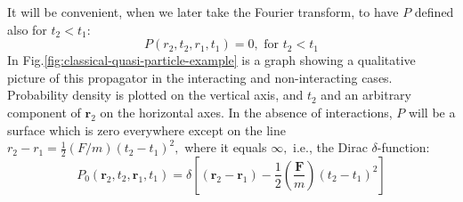 It will be convenient, when we later take the Fourier transform, to have $P$ defined also for $t_2<t_1$:
\begin{equation}P\left(r_{2}, t_{2}, r_{1}, t_{1}\right)=0, \text { for } t_{2}<t_{1}
\label{zero-condition}
\end{equation}
In Fig.\ref{fig:classical-quasi-particle-example} is a graph showing a qualitative picture of this propagator in the interacting and non-interacting cases. Probability density is plotted on the vertical axis, and $t_{2}$ and an arbitrary component of $\mathbf{r}_{2}$ on the horizontal axes. In the absence of interactions, $P$ will be a surface which is zero everywhere except on the line $r_{2}-r_{1}=\frac{1}{2}(F / m)\left(t_{2}-t_{1}\right)^{2},$ where it equals $\infty,$ i.e., the Dirac $\delta$-function:
\begin{equation}P_{0}\left(\mathbf{r}_{2}, t_{2}, \mathbf{r}_{1}, t_{1}\right)=\delta\left[\left(\mathbf{r}_{2}-\mathbf{r}_{1}\right)-\frac{1}{2}\left(\frac{\mathbf{F}}{m}\right)\left(t_{2}-t_{1}\right)^{2}\right]\end{equation}

